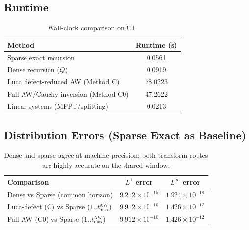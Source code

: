 \documentclass[11pt,a4paper]{article}
\begin{document}
\subsection{Runtime}
\begin{table}[H]
  \centering
  \begin{tabular}{lc}
    \toprule
    Method & Runtime (s) \\
    \midrule
    Sparse exact recursion & 0.0561 \\
    Dense recursion ($Q$) & 0.0919 \\
    Luca defect-reduced AW (Method C) & 78.0223 \\
    Full AW/Cauchy inversion (Method C0) & 47.2622 \\
    Linear systems (MFPT/splitting) & 0.0213 \\
    \bottomrule
  \end{tabular}
  \caption{Wall-clock comparison on C1.}
\end{table}

\subsection{Distribution Errors (Sparse Exact as Baseline)}
\begin{table}[H]
  \centering
  \begin{tabular}{lcc}
    \toprule
    Comparison & $L^1$ error & $L^\infty$ error \\
    \midrule
    Dense vs Sparse (common horizon) & $9.212\times10^{-15}$ & $1.924\times10^{-18}$ \\
    Luca-defect (C) vs Sparse ($1..t_{\max}^{\mathrm{AW}}$) & $9.912\times10^{-10}$ & $1.426\times10^{-12}$ \\
    Full AW (C0) vs Sparse ($1..t_{\max}^{\mathrm{AW}}$) & $9.912\times10^{-10}$ & $1.426\times10^{-12}$ \\
    \bottomrule
  \end{tabular}
  \caption{Dense and sparse agree at machine precision; both transform routes are highly accurate on the shared window.}
\end{table}
\end{document}
